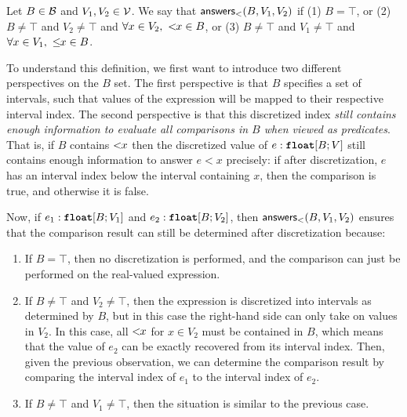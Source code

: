 \begin{definition}
	\label{def:answers-less}
	Let $B\in \mathcal{B}$ and $V_1, V_2 \in\mathcal{V}$.
	We say that \emph{$\mathsf{answers}_<(B, V_1, V_2)$} if  (1) $B = \top$, or (2) $B \neq \top$ and $V_2 \neq \top$ and $\forall x \in V_2,\ <\!\!{x} \in B$, or
		(3) $B \neq \top$ and $V_1 \neq \top$ and $\forall x \in V_1,\ \leq\!\!{x} \in B$.
\end{definition}


To understand this definition, we first want to introduce two different perspectives on the $B$ set. The first perspective is that $B$ specifies a set of intervals, such that values of the expression will be mapped to their respective interval index. The second perspective is that this discretized index \emph{still contains enough information to evaluate all comparisons in $B$ when viewed as predicates}. That is, if $B$ contains $<\!\!{x}$ then the discretized value of $e : \textnormal{\ttfamily\bfseries float}[B; V]$ still contains enough information to answer $e < x$ precisely: if after discretization, $e$ has an interval index below the interval containing $x$, then the comparison is true, and otherwise it is false.

Now, if $e_1 : \textnormal{\ttfamily\bfseries float}[B; V_1]$ and $e_2 : \textnormal{\ttfamily\bfseries float}[B; V_2]$, then $\mathsf{answers}_<(B, V_1, V_2)$ ensures that the comparison result can still be determined after discretization because:

\begin{enumerate}
	\item If $B = \top$, then no discretization is performed, and the comparison can just be performed on the real-valued expression.
	\item If $B \neq \top$ and $V_2 \neq \top$, then the expression is discretized into intervals as determined by $B$, but in this case the right-hand side can only take on values in $V_2$. In this case, all $<\!\!{x}$ for $x \in V_2$ must be contained in $B$, which means that the value of $e_2$ can be exactly recovered from its interval index.
	Then, given the previous observation, we can determine the comparison result by comparing the interval index of $e_1$ to the interval index of $e_2$.
	\item If $B \neq \top$ and $V_1 \neq \top$, then the situation is similar to the previous case.
\end{enumerate}

